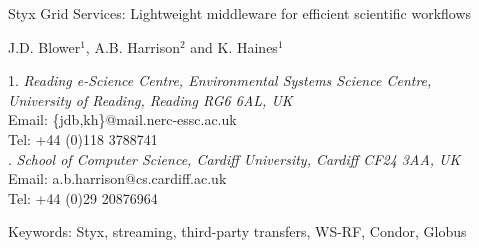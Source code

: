 \documentclass[a4paper]{article}
\begin{document}
\doublespacing

\begin{center}
{\Large Styx Grid Services: Lightweight middleware for efficient scientific workflows}

\bigskip
\bigskip

{\large J.D. Blower$^{1}$, A.B. Harrison$^{2}$ and K. Haines$^{1}$}

\bigskip

{\small 1. \textit{Reading e-Science Centre, Environmental Systems Science Centre, \\
University of Reading, Reading RG6 6AL, UK} \\
Email: \{jdb,kh\}@mail.nerc-essc.ac.uk\\
Tel: +44 (0)118 3788741 \\
. \textit{School of Computer Science, Cardiff University, Cardiff CF24 3AA, UK}\\
Email: a.b.harrison@cs.cardiff.ac.uk\\
Tel: +44 (0)29 20876964}

\bigskip
\bigskip

Keywords: Styx, streaming, third-party transfers, WS-RF, Condor, Globus

\end{center}

\newpage

\begin{abstract}
The service-oriented approach to performing distributed scientific research is potentially very powerful but is not yet widely used in many scientific fields.  This is partly due to the technical difficulties involved in creating services and workflows and the inefficiency of many workflow systems with regard to handling large datasets.  We present the Styx Grid Service, a simple system that wraps command-line programs and allows them to be run over the Internet exactly as if they were local programs.  Styx Grid Services are very easy to create and use and can be composed into powerful workflows with simple shell scripts or more sophisticated graphical tools.  An important feature of the system is that data can be streamed directly from service to service, significantly increasing the efficiency of workflows that use large data volumes.  The status and progress of Styx Grid Services can be monitored asynchronously using a mechanism that places very few demands on firewalls.  We show how Styx Grid Services can interoperate with with Web Services and WS-Resources using suitable adapters.
\end{abstract}
\end{document}
